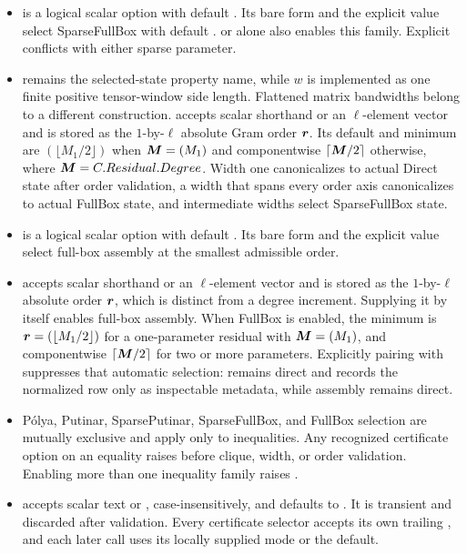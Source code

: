 \begin{itemize}[leftmargin=*]
  \item {}\allowbreak{} is a logical scalar option with default . Its bare form and the explicit value  select SparseFullBox with default .  or  alone also enables this family. Explicit \allowbreak{} conflicts with either sparse parameter.
  \item {} remains the selected-state property name, while $w$ is implemented as one finite positive tensor-window side length. Flattened matrix bandwidths belong to a different construction.  accepts scalar shorthand or an $\ell$-element vector and is stored as the $1$-by-$\ell$ absolute Gram order $\boldsymbol{r}$. Its default and minimum are $(\lfloor M_1/2\rfloor)$ when $\boldsymbol{M}=(M_1)$ and componentwise $\lceil\boldsymbol{M}/2\rceil$ otherwise, where $\boldsymbol{M}=C.Residual.Degree$. Width one canonicalizes to actual Direct state after order validation, a width that spans every order axis canonicalizes to actual FullBox state, and intermediate widths select SparseFullBox state.
  \item {} is a logical scalar option with default . Its bare form and the explicit value  select full-box assembly at the smallest admissible order.
  \item {} accepts scalar shorthand or an $\ell$-element vector and is stored as the $1$-by-$\ell$ absolute order $\boldsymbol{r}$, which is distinct from a degree increment. Supplying it by itself enables full-box assembly. When FullBox is enabled, the minimum is $\boldsymbol{r}=(\lfloor M_1/2\rfloor)$ for a one-parameter residual with $\boldsymbol{M}=(M_1)$, and componentwise $\lceil\boldsymbol{M}/2\rceil$ for two or more parameters. Explicitly pairing  with  suppresses that automatic selection:  remains direct and records the normalized row only as inspectable metadata, while assembly remains direct.
  \item P\'olya, Putinar, SparsePutinar, SparseFullBox, and FullBox selection are mutually exclusive and apply only to inequalities. Any recognized certificate option on an equality raises \allowbreak{} before clique, width, or order validation. Enabling more than one inequality family raises \allowbreak{}.
  \item {} accepts scalar text  or , case-insensitively, and defaults to . It is transient and discarded after validation. Every certificate selector accepts its own trailing , and each later call uses its locally supplied mode or the default.

\end{itemize}
